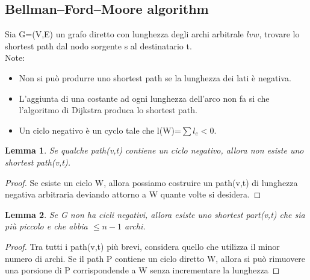 \documentclass{article}
\newtheorem{lemma}{Lemma}[subsection]
\begin{document}
\subsection{Bellman–Ford–Moore algorithm}
Sia G=(V,E) un grafo diretto con lunghezza degli archi arbitrale $l{vw}$, trovare lo shortest path dal nodo sorgente s al destinatario t.\\
Note:
\begin{itemize}
    \item Non si può produrre uno shortest path se la lunghezza dei lati è negativa.
    \item L'aggiunta di una costante ad ogni lunghezza dell'arco non fa si che l'algoritmo di Dijkstra produca lo shortest path.
    \item Un ciclo negativo è un cyclo tale che l(W)=$\sum l_e<0$.
\end{itemize}
\begin{lemma}
    Se qualche path(v,t) contiene un ciclo negativo, allora non esiste uno shortest path(v,t).
\end{lemma}
\begin{proof}
    Se esiste un ciclo W, allora possiamo costruire un path(v,t) di lunghezza negativa arbitraria deviando attorno a W quante volte si desidera.
\end{proof}
\begin{lemma}
    Se G non ha cicli negativi, allora esiste uno shortest part(v,t) che sia più piccolo e che abbia $\leq n-1$ archi.
\end{lemma}
\begin{proof}
    Tra tutti i path(v,t) più brevi, considera quello che utilizza il minor numero di archi. Se il path P contiene un ciclo diretto W, allora si può rimuovere una porsione di P corrispondende a W senza incrementare la lunghezza
\end{proof}
\end{document}
